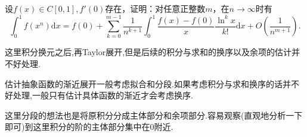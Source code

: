\documentclass[../../main.tex]{subfiles}
\begin{document}
\begin{example}
设\(f(x)\in C[0,1],f'(0)\)存在，证明：对任意正整数\(m\)，在\(n\rightarrow\infty\)时有
\[
\int_{0}^{1}f(x^{n})\mathrm{d}x = f(0)+\sum_{k = 0}^{m - 1}\frac{1}{n^{k + 1}}\int_{0}^{1}\frac{f(x)-f(0)}{x}\frac{\ln^{k}x}{k!}\mathrm{d}x + O\left(\frac{1}{n^{m+1}}\right).
\]
\end{example}
\begin{remark}
这里积分换元之后,再Taylor展开,但是后续的积分与求和的换序以及余项的估计并不好处理.
\end{remark}
\begin{note}
估计抽象函数的渐近展开一般考虑拟合和分段.如果考虑积分与求和换序的话并不好处理,一般只有估计具体函数的渐近才会考虑换序.

这里分段的想法也是将原积分分成主体部分和余项部分.容易观察(直观地分析一下即可)到这里积分的阶的主体部分集中在0附近.
\end{note}
\end{document}

